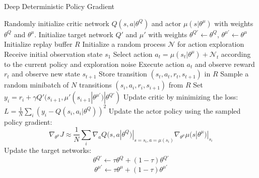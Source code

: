 \begin{algorithm}[h]
  \caption{Deep Deterministic Policy Gradient \cite{timothy2016cont} \label{algo:ddpg}}
  \label{dpgalgo}
  \begin{algorithmic}
    \State Randomly initialize critic network $Q(s, a | \theta^Q)$ and actor
    $\mu(s | \theta^{\mu})$ with weights $\theta^{Q}$ and $\theta^{\mu}$.
    \State Initialize target network $Q'$ and $\mu'$ with weights $\theta^{Q'}
    \leftarrow \theta^{Q}$, $\theta^{\mu'} \leftarrow \theta^{\mu}$
    \State Initialize replay buffer $R$
      \State Initialize a random process $\mathcal{N}$ for action
      exploration
      \State Receive initial observation state $s_1$
        \State Select action $a_t = \mu(s_t | \theta^{\mu}) + \mathcal{N}_t$
        according to the current policy and exploration noise
        \State Execute action $a_t$ and observe
        reward $r_t$ and observe new state $s_{t+1}$
        \State Store transition $(s_t, a_t,
                r_t, s_{t+1})$ in $R$
        \State Sample a random minibatch of $N$ transitions
               $(s_i, a_i,
        r_i, s_{i + 1})$ from $R$
        \State Set $ y_i = r_i + \gamma Q'(s_{i + 1},
        \mu'(s_{i+1} | \theta^{\mu'}) | \theta^{Q'}) $
        \State Update critic by minimizing the loss:
               $L = \frac{1}{N} \sum_i (y_i -
               Q(s_i, a_i | \theta^Q))^2$
        \State Update the actor policy using the sampled policy gradient:
        \begin{equation*}
            \nabla_{\theta^{\mu}} J \approx
            \frac{1}{N} \sum_i
               \nabla_{a} Q(s, a | \theta^Q)|_{s = s_i, a = \mu(s_i)}
               \nabla_{\theta^\mu} \mu(s | \theta^\mu)|_{s_i}
         \end{equation*}
        \State Update the target networks:
          \begin{equation*}
            \theta^{Q'} \leftarrow \tau \theta^{Q} + (1 - \tau) \theta^{Q'}
          \end{equation*}
          \begin{equation*}
            \theta^{\mu'} \leftarrow \tau \theta^{\mu} +
                (1 - \tau) \theta^{\mu'}
          \end{equation*}
        \EndFor
    \EndFor
  \end{algorithmic}
\end{algorithm}
